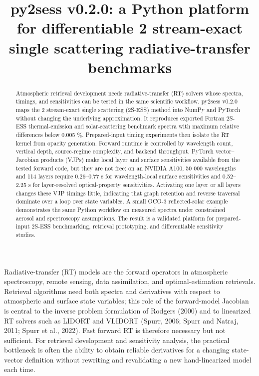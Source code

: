 \documentclass[gmd, manuscript]{copernicus}
\begin{document}
\sloppy

\title{py2sess v0.2.0: a Python platform for differentiable 2 stream-exact single scattering radiative-transfer benchmarks}




\received{}
\pubdiscuss{}
\revised{}
\accepted{}
\published{}

\maketitle

\begin{abstract}
Atmospheric retrieval development needs radiative-transfer (RT) solvers whose spectra,
timings, and sensitivities can be tested in the same scientific workflow.  py2sess
v0.2.0 maps the 2 stream-exact single scattering (2S-ESS) method into NumPy and
PyTorch without changing the underlying approximation.  It reproduces exported Fortran
2S-ESS thermal-emission and solar-scattering benchmark spectra with maximum relative
differences below 0.005 \%.  Prepared-input timing experiments then isolate the RT
kernel from opacity generation.  Forward runtime is controlled by wavelength count,
vertical depth, source-regime complexity, and backend throughput.  PyTorch
vector--Jacobian products (VJPs) make local layer and surface sensitivities available
from the tested forward code, but they are not free: on an NVIDIA A100, 50 000
wavelengths and 114 layers require 0.26--0.77 s for wavelength-local surface
sensitivities and 0.52--2.25 s for layer-resolved optical-property sensitivities.
Activating one layer or all layers changes these VJP timings little, indicating that
graph retention and reverse traversal dominate over a loop over state variables.  A
small OCO-3 reflected-solar example demonstrates the same Python workflow on measured
spectra under constrained aerosol and spectroscopy assumptions.  The result is a
validated platform for prepared-input 2S-ESS benchmarking, retrieval prototyping, and
differentiable sensitivity studies.
\end{abstract}

\introduction

Radiative-transfer (RT) models are the forward operators in atmospheric spectroscopy,
remote sensing, data assimilation, and optimal-estimation retrievals.  Retrieval
algorithms need both spectra and derivatives with respect to atmospheric and surface
state variables; this role of the forward-model Jacobian is central to the inverse
problem formulation of Rodgers (2000) and to linearized RT solvers such as LIDORT and
VLIDORT (Spurr, 2006; Spurr and Natraj, 2011; Spurr et al., 2022).  Fast forward RT is
therefore necessary but not sufficient.  For retrieval development and sensitivity
analysis, the practical bottleneck is often the ability to obtain reliable derivatives
for a changing state-vector definition without rewriting and revalidating a new
hand-linearized model each time.
\end{document}
